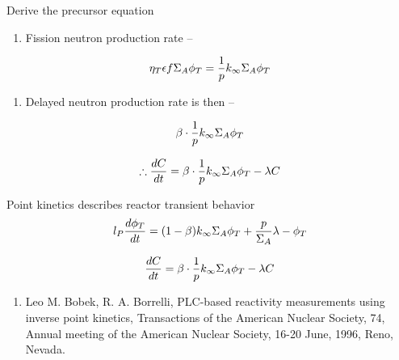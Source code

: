 \documentclass[aspectratio=1610,pdftex,dvipsnames,compress,xcolor={dvipsnames}]{beamer}
\begin{document}
\begin{frame}{Derive the precursor equation}
    \begin{enumerate}[series=outerlist,topsep=0pt,itemsep=21pt,leftmargin=*,label=(\arabic*)]
        \item[]Fission neutron production rate --
    \end{enumerate}

    \vspace*{\fill}

    \begin{equation}
        \LARGE
        \eta_T \epsilon f \Sigma_A \phi_T = \frac{1}{p} k_\infty \Sigma_A \phi_T
    \end{equation}

    \vspace*{\fill}

    \begin{enumerate}[series=outerlist,topsep=0pt,itemsep=21pt,leftmargin=*,label=(\arabic*)]
        \item[]Delayed neutron production rate is then --
    \end{enumerate}

    \vspace*{\fill}

    \begin{equation}
        \LARGE
        \beta \cdot \frac{1}{p} k_\infty \Sigma_A \phi_T
    \end{equation}

    \begin{equation}
        \LARGE
        \therefore \frac{dC}{dt} = \beta \cdot \frac{1}{p} k_\infty \Sigma_A \phi_T - \lambda C
    \end{equation}
\end{frame}


\begin{frame}{Point kinetics describes reactor transient behavior}
    \begin{equation}
        \LARGE
        l_P \frac{d\phi_T}{dt} = (1-\beta) k_\infty \Sigma_A \phi_T + \frac{p}{\Sigma_A} \lambda - \phi_T
    \end{equation}

    \begin{equation}
        \LARGE
        \frac{dC}{dt} = \beta \cdot \frac{1}{p} k_\infty \Sigma_A \phi_T -\lambda C
    \end{equation}

    \vspace*{\fill}

    \begin{enumerate}[series=outerlist,topsep=0pt,itemsep=21pt,leftmargin=*,label=(\arabic*)]
        \item[]Leo M. Bobek, R. A. Borrelli, PLC-based reactivity measurements using inverse point kinetics, Transactions of the American Nuclear Society, 74, Annual meeting of the American Nuclear Society, 16-20 June, 1996, Reno, Nevada.
    \end{enumerate}
\end{frame}
\end{document}
